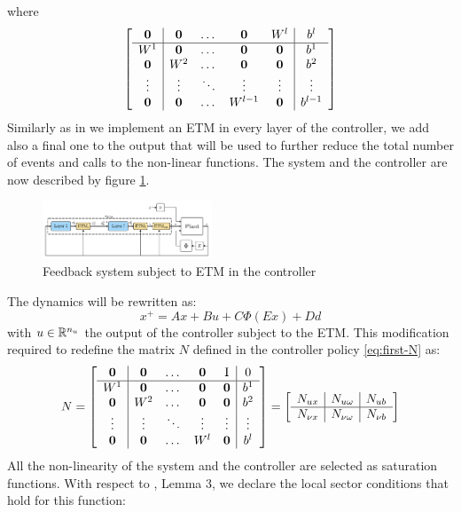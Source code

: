 \documentclass{article}
\begin{document}
where
\begin{equation}\label{eq:first-N}
  \left[\begin{matrix}
    \begin{array}{c | c c c c | c}
      \operatorname{\mathbf{0}} & \operatorname{\mathbf{0}} & \dots & \operatorname{\mathbf{0}} & W^l & b^l \\ 
      \hline
      W^1 & \operatorname{\mathbf{0}} & \dots & \operatorname{\mathbf{0}} & \operatorname{\mathbf{0}} & b^1 \\
      \operatorname{\mathbf{0}} & W^2 & \dots & \operatorname{\mathbf{0}} & \operatorname{\mathbf{0}} & b^2 \\
      \vdots & \vdots & \ddots & \vdots & \vdots & \vdots \\
      \operatorname{\mathbf{0}} & \operatorname{\mathbf{0}} & \dots & W^{l-1} & \operatorname{\mathbf{0}} & b^{l-1}
    \end{array}
  \end{matrix}\right]
\end{equation}
Similarly as in \cite{css-extended} we implement an ETM in every layer of the controller, we add also a final one to the output that will be used to further reduce the total number of events and calls to the non-linear functions. The system and the controller are now described by figure \ref{fig:second_scheme}.
\begin{figure}[H]
    \centering
    \includegraphics[width=0.45\textwidth]{img/second_scheme}
    \centering
    \caption{Feedback system subject to ETM in the controller}
    \label{fig:second_scheme}
\end{figure}
The dynamics will be rewritten as:
\begin{equation}\label{eq:system-dynamics}
  x^{+} = A x + B u + C \Phi(E x) + D d
\end{equation}
with $u \in {\mathbb{R}}^{n_u}$ the output of the controller subject to the ETM. This modification required to redefine the matrix $N$ defined in the controller policy \ref{eq:first-N} as:
\begin{equation}\label{eq:last-N}
  N = \left[\begin{matrix}
    \begin{array}{c | c c c c | c}
      \operatorname{\mathbf{0}} & \operatorname{\mathbf{0}} & \dots & \operatorname{\mathbf{0}} & \operatorname{I} & 0 \\ 
      \hline
      W^1 & \operatorname{\mathbf{0}} & \dots & \operatorname{\mathbf{0}} & \operatorname{\mathbf{0}} & b^1 \\
      \operatorname{\mathbf{0}} & W^2 & \dots & \operatorname{\mathbf{0}} & \operatorname{\mathbf{0}} & b^2 \\
      \vdots & \vdots & \ddots & \vdots & \vdots & \vdots \\
      \operatorname{\mathbf{0}} & \operatorname{\mathbf{0}} & \dots & W^l & \operatorname{\mathbf{0}} & b^l
    \end{array}
  \end{matrix}\right] = \left[\begin{matrix}
    \begin{array}{c | c | c}
    N_{u x} & N_{u \omega} & N_{u b} \\
    \hline
    N_{\nu x} & N_{\nu \omega} & N_{\nu b}
    \end{array} 
  \end{matrix}\right]
\end{equation}
All the non-linearity of the system and the controller are selected as saturation functions. With respect to \cite{css-extended}, Lemma 3, we declare the local sector conditions that hold for this function:
\end{document}
